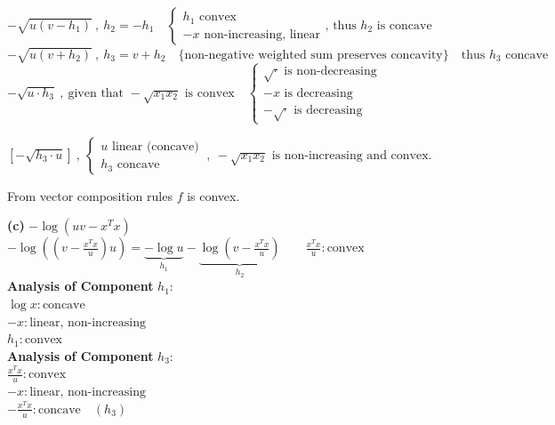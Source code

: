 \documentclass{article}
\begin{document}
\noindent $-\sqrt{u(v - h_1)} \ , \ h_2 = -h_1 \quad 
\begin{cases} 
h_1 \text{ convex} \\ 
-x \text{ non-increasing, linear} 
\end{cases} 
\text{, thus } h_2 \text{ is concave}$ \\

\noindent $-\sqrt{u(v + h_2)} \ , \ h_3 = v + h_2 \quad 
\{ \text{non-negative weighted sum preserves concavity} \} \quad 
\text{thus } h_3 \text{ concave}$ \\

\noindent $-\sqrt{u \cdot h_3} \ , \ \text{given that } -\sqrt{x_1 x_2} \text{ is convex} \quad 
\begin{cases} 
\sqrt{\cdot} \text{ is non-decreasing} \\ 
-x \text{ is decreasing} \\ 
-\sqrt{\cdot} \text{ is decreasing} 
\end{cases}$ \\

\vspace{1em}

\noindent $\left[ -\sqrt{h_3 \cdot u} \right] \ , \ 
\begin{cases} 
u \text{ linear (concave)} \\ 
h_3 \text{ concave} 
\end{cases} \ , \ -\sqrt{x_1 x_2} \text{ is non-increasing and convex.}$ \\

\vspace{1em}

\noindent From vector composition rules $f$  is convex.


\textbf{(c)} \noindent $-\log(uv - x^Tx)$ \\[1.5em]

\noindent $-\log((v - \frac{x^Tx}{u})u) = \underbrace{-\log u}_{h_1} - \underbrace{\log(v - \frac{x^Tx}{u})}_{h_2} \qquad \frac{x^Tx}{u} : \text{convex}$ \\[2em]

\noindent \textbf{Analysis of Component } $h_1$: \\
\indent $\log x : \text{concave}$ \\
\indent $-x : \text{linear, non-increasing}$ \\
\indent $h_1 : \text{convex}$ \\[1.5em]

\noindent \textbf{Analysis of Component } $h_3$: \\
\indent $\frac{x^Tx}{u} : \text{convex}$ \\
\indent $-x : \text{linear, non-increasing}$ \\
\indent $-\frac{x^Tx}{u} : \text{concave} \quad (h_3)$ \\[1.5em]
\end{document}
